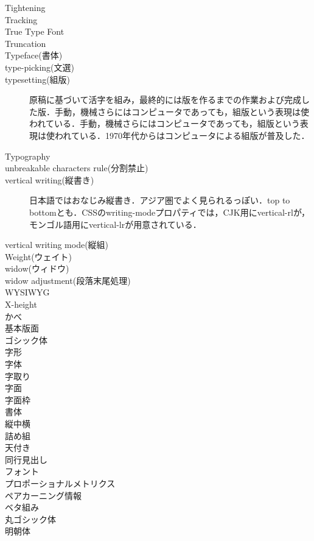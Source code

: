 \begin{description}
    \item[Tightening]
    \item[Tracking]
    \item[True Type Font]
    \item[Truncation]
    \item[Typeface(書体)]
    \item[type-picking(文選)]
    \item[typesetting(組版)] 原稿に基づいて活字を組み，最終的には版を作るまでの作業および完成した版．手動，機械さらにはコンピュータであっても，組版という表現は使われている．手動，機械さらにはコンピュータであっても，組版という表現は使われている\cite{lis_dictionary}．1970年代からはコンピュータによる組版が普及した\cite{www.printing-museum.org:communication/column/pdf/column_6.pdf}．
    \item[Typography]
    \item[unbreakable characters rule(分割禁止)]
    \item[vertical writing(縦書き)] 日本語ではおなじみ縦書き．アジア圏でよく見られるっぽい．top to bottomとも\cite{eikaiwa.dmm.com:uknow/questions/29852/}\cite{www.w3.org:International/questions/qa-scripts}．CSSの{\sf writing-mode}プロパティでは，CJK用に{\sf vertical-rl}が，モンゴル語用に{\sf vertical-lr}が用意されている\cite{www.w3.org:International/articles/vertical-text/}．
    \item[vertical writing mode(縦組)]
    \item[Weight(ウェイト)]
    \item[widow(ウィドウ)]
    \item[widow adjustment(段落末尾処理)]
    \item[WYSIWYG]
    \item[X-height]
    \item[かべ]
    \item[基本版面]
    \item[ゴシック体]
    \item[字形]
    \item[字体]
    \item[字取り]
    \item[字面]
    \item[字面枠]
    \item[書体]
    \item[縦中横]
    \item[詰め組]
    \item[天付き]
    \item[同行見出し]
    \item[フォント]
    \item[プロポーショナルメトリクス]
    \item[ペアカーニング情報]
    \item[ベタ組み]
    \item[丸ゴシック体]
    \item[明朝体]
\end{description}

